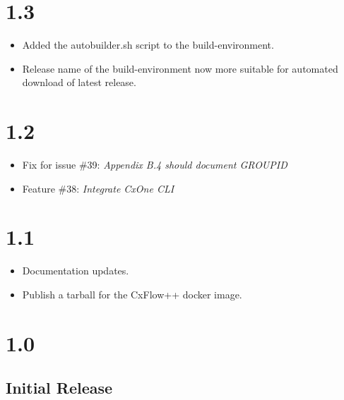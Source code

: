 
\section{1.3}

\begin{itemize}
    \item Added the autobuilder.sh script to the build-environment.
    \item Release name of the build-environment now more suitable for automated download of latest release.
\end{itemize}


\section{1.2}

\begin{itemize}
    \item Fix for issue \#39: \textit{Appendix B.4 should document GROUP\textunderscore ID}
    \item Feature \#38: \textit{Integrate CxOne CLI}
\end{itemize}

\section{1.1}

\begin{itemize}
    \item Documentation updates.
    \item Publish a tarball for the CxFlow++ docker image.
\end{itemize}

\section{1.0}

\subsection*{Initial Release}
